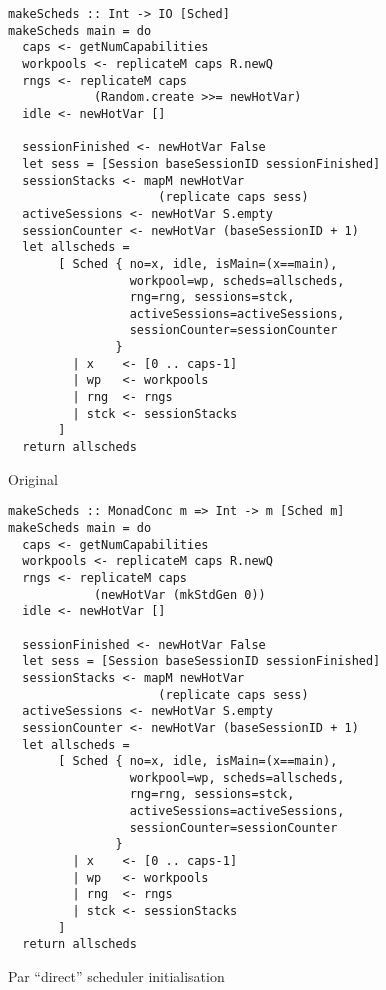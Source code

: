\begin{landscape}
\begin{figure*}[t]
  \captionsetup{format=fnoline}
  \centering
  \begin{minipage}[t]{0.49\linewidth}
    \begin{verbatim}
makeScheds :: Int -> IO [Sched]
makeScheds main = do
  caps <- getNumCapabilities
  workpools <- replicateM caps R.newQ
  rngs <- replicateM caps
            (Random.create >>= newHotVar)
  idle <- newHotVar []

  sessionFinished <- newHotVar False
  let sess = [Session baseSessionID sessionFinished]
  sessionStacks <- mapM newHotVar
                     (replicate caps sess)
  activeSessions <- newHotVar S.empty
  sessionCounter <- newHotVar (baseSessionID + 1)
  let allscheds =
       [ Sched { no=x, idle, isMain=(x==main),
                 workpool=wp, scheds=allscheds,
                 rng=rng, sessions=stck,
                 activeSessions=activeSessions,
                 sessionCounter=sessionCounter
               }
         | x    <- [0 .. caps-1]
         | wp   <- workpools
         | rng  <- rngs
         | stck <- sessionStacks
       ]
  return allscheds
    \end{verbatim}
    \caption*{Original}
  \end{minipage}
  \begin{minipage}[t]{0.49\linewidth}
    \begin{verbatim}
makeScheds :: MonadConc m => Int -> m [Sched m]
makeScheds main = do
  caps <- getNumCapabilities
  workpools <- replicateM caps R.newQ
  rngs <- replicateM caps
            (newHotVar (mkStdGen 0))
  idle <- newHotVar []

  sessionFinished <- newHotVar False
  let sess = [Session baseSessionID sessionFinished]
  sessionStacks <- mapM newHotVar
                     (replicate caps sess)
  activeSessions <- newHotVar S.empty
  sessionCounter <- newHotVar (baseSessionID + 1)
  let allscheds =
       [ Sched { no=x, idle, isMain=(x==main),
                 workpool=wp, scheds=allscheds,
                 rng=rng, sessions=stck,
                 activeSessions=activeSessions,
                 sessionCounter=sessionCounter
               }
         | x    <- [0 .. caps-1]
         | wp   <- workpools
         | rng  <- rngs
         | stck <- sessionStacks
       ]
  return allscheds
    \end{verbatim}
    \caption*{\dejafu{}}
  \end{minipage}
  \caption{Par ``direct'' scheduler initialisation}
  \label{fig:example-parmonad-sched}
\end{figure*}
\end{landscape}
